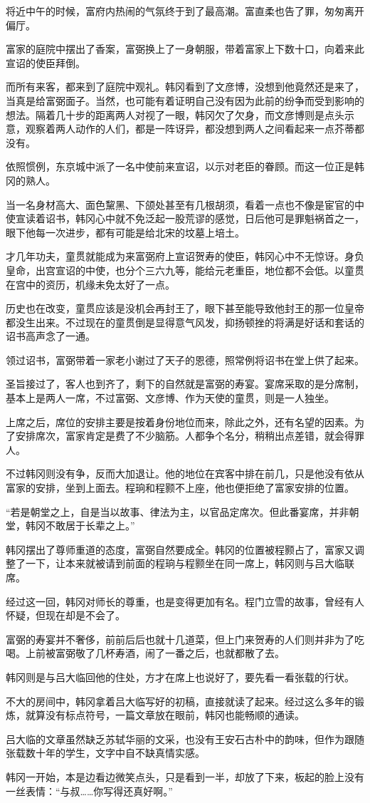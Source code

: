 将近中午的时候，富府内热闹的气氛终于到了最高潮。富直柔也告了罪，匆匆离开偏厅。

富家的庭院中摆出了香案，富弼换上了一身朝服，带着富家上下数十口，向着来此宣诏的使臣拜倒。

而所有来客，都来到了庭院中观礼。韩冈看到了文彦博，没想到他竟然还是来了，当真是给富弼面子。当然，也可能有着证明自己没有因为此前的纷争而受到影响的想法。隔着几十步的距离两人对视了一眼，韩冈欠了欠身，而文彦博则是点头示意，观察着两人动作的人们，都是一阵讶异，都没想到两人之间看起来一点芥蒂都没有。

依照惯例，东京城中派了一名中使前来宣诏，以示对老臣的眷顾。而这一位正是韩冈的熟人。

当一名身材高大、面色黧黑、下颌处甚至有几根胡须，看着一点也不像是宦官的中使宣读着诏书，韩冈心中就不免泛起一股荒谬的感觉，日后他可是罪魁祸首之一，眼下他每一次进步，都有可能是给北宋的坟墓上培土。

才几年功夫，童贯就能成为来富弼府上宣诏贺寿的使臣，韩冈心中不无惊讶。身负皇命，出宫宣诏的中使，也分个三六九等，能给元老重臣，地位都不会低。以童贯在宫中的资历，机缘未免太好了一点。

历史也在改变，童贯应该是没机会再封王了，眼下甚至能导致他封王的那一位皇帝都没生出来。不过现在的童贯倒是显得意气风发，抑扬顿挫的将满是好话和套话的诏书高声念了一通。

领过诏书，富弼带着一家老小谢过了天子的恩德，照常例将诏书在堂上供了起来。

圣旨接过了，客人也到齐了，剩下的自然就是富弼的寿宴。宴席采取的是分席制，基本上是两人一席，不过富弼、文彦博、作为天使的童贯，则是一人独坐。

上席之后，席位的安排主要是按着身份地位而来，除此之外，还有名望的因素。为了安排席次，富家肯定是费了不少脑筋。人都争个名分，稍稍出点差错，就会得罪人。

不过韩冈则没有争，反而大加退让。他的地位在宾客中排在前几，只是他没有依从富家的安排，坐到上面去。程珦和程颢不上座，他也便拒绝了富家安排的位置。

“若是朝堂之上，自是当以故事、律法为主，以官品定席次。但此番宴席，并非朝堂，韩冈不敢居于长辈之上。”

韩冈摆出了尊师重道的态度，富弼自然要成全。韩冈的位置被程颢占了，富家又调整了一下，让本来就被请到前面的程珦与程颢坐在同一席上，韩冈则与吕大临联席。

经过这一回，韩冈对师长的尊重，也是变得更加有名。程门立雪的故事，曾经有人怀疑，但现在却是不会了。

富弼的寿宴并不奢侈，前前后后也就十几道菜，但上门来贺寿的人们则并非为了吃喝。上前被富弼敬了几杯寿酒，闹了一番之后，也就都散了去。

韩冈则是与吕大临回他的住处，方才在席上也说好了，要先看一看张载的行状。

不大的房间中，韩冈拿着吕大临写好的初稿，直接就读了起来。经过这么多年的锻炼，就算没有标点符号，一篇文章放在眼前，韩冈也能畅顺的通读。

吕大临的文章虽然缺乏苏轼华丽的文采，也没有王安石古朴中的韵味，但作为跟随张载数十年的学生，文字中自不缺真情实感。

韩冈一开始，本是边看边微笑点头，只是看到一半，却放了下来，板起的脸上没有一丝表情：“与叔……你写得还真好啊。”


